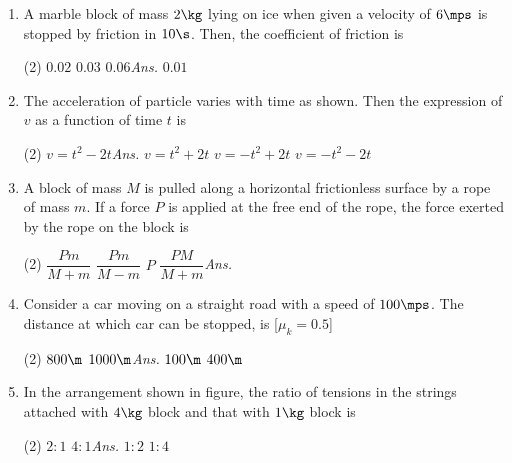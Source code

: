 \documentclass{article}
\newcommand{\ans}{\textcolor{red!95}{\textit{\quad Ans.}}}
\begin{document}
\begin{enumerate}
\item A marble block of mass $2 \kg$ lying on ice when given a velocity of $6\mps$ is stopped by friction in $10 \s$. Then, the coefficient of friction is
\begin{tasks}(2)
	\task $0.02$
	\task $0.03$
	\task $0.06$\ans
	\task $0.01$
\end{tasks}

\item The acceleration of particle varies with time as shown. Then the expression of $v$ as a function of time $t$ is
\begin{center}
\end{center}
\begin{tasks}(2)
	\task $v=t^2-2t$\ans
	\task $v=t^2+2t$
	\task $v=-t^2+2t$
	\task $v=-t^2-2t$
\end{tasks}

\item A block of mass $M$ is pulled along a horizontal frictionless surface by a rope of mass $m$. If a force $P$ is applied at the free end of the rope, the force exerted by the rope on the block is
\begin{tasks}(2)
	\task $\dfrac{Pm}{M+m}$
	\task $\dfrac{Pm}{M-m}$
	\task $P$
	\task $\dfrac{PM}{M+m}$\ans
\end{tasks}


\item Consider a car moving on a straight road with a speed of $100 \mps$. The distance at which car can be stopped, is [$\mu_k = 0.5$]
\begin{tasks}(2)
	\task $800\m$
	\task $1000\m$\ans 
	\task $100\m$
	\task $400\m$
\end{tasks}


\item In the arrangement shown in figure, the ratio of tensions in the strings attached with $4 \kg$ block and that with $1 \kg$ block is
\begin{center}
\end{center} 
\begin{tasks}(2)
	\task $2:1$
	\task $4:1$\ans
	\task $1:2$
	\task $1:4$
\end{tasks}


\end{enumerate}
\end{document}

